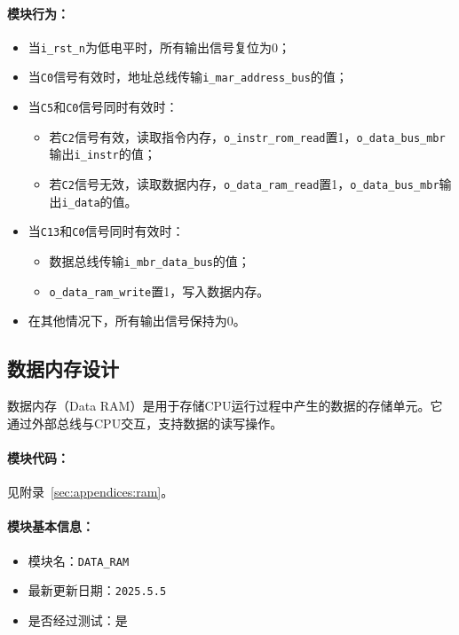 \documentclass[lang=cn,a4paper,newtx]{elegantpaper}
\begin{document}
\paragraph{模块行为：}
\begin{itemize}
  \item 当\texttt{i\_rst\_n}为低电平时，所有输出信号复位为0；
  \item 当\texttt{C0}信号有效时，地址总线传输\texttt{i\_mar\_address\_bus}的值；
  \item 当\texttt{C5}和\texttt{C0}信号同时有效时：
    \begin{itemize}
      \item 若\texttt{C2}信号有效，读取指令内存，\texttt{o\_instr\_rom\_read}置1，\texttt{o\_data\_bus\_mbr}输出\texttt{i\_instr}的值；
      \item 若\texttt{C2}信号无效，读取数据内存，\texttt{o\_data\_ram\_read}置1，\texttt{o\_data\_bus\_mbr}输出\texttt{i\_data}的值。
    \end{itemize}
  \item 当\texttt{C13}和\texttt{C0}信号同时有效时：
    \begin{itemize}
      \item 数据总线传输\texttt{i\_mbr\_data\_bus}的值；
      \item \texttt{o\_data\_ram\_write}置1，写入数据内存。
    \end{itemize}
  \item 在其他情况下，所有输出信号保持为0。
\end{itemize}
\subsection{数据内存设计}
数据内存（Data RAM）是用于存储CPU运行过程中产生的数据的存储单元。它通过外部总线与CPU交互，支持数据的读写操作。
\paragraph{模块代码：}
见附录~\ref{sec:appendices:ram}。

\paragraph{模块基本信息：}
\begin{itemize}
  \item 模块名：\texttt{DATA\_RAM}
  \item 最新更新日期：\texttt{2025.5.5}
  \item 是否经过测试：是
\end{itemize}
\end{document}
